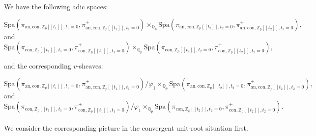 \documentclass[11pt]{book}
\theoremstyle{definition}
\numberwithin{equation}{section}
\begin{document}
\indent We have the following adic spaces:

\begin{displaymath}
\mathrm{Spa}(\pi_{\mathrm{an},\mathrm{con},\mathbb{Z}_p[[t_1]],t_1=0},\pi_{\mathrm{an},\mathrm{con},\mathbb{Z}_p[[t_1]],t_1=0}^+)\times_{\mathbb{Q}_p}\mathrm{Spa}(\pi_{\mathrm{an},\mathrm{con},\mathbb{Z}_p[[t_2]],t_2=0},\pi_{\mathrm{an},\mathrm{con},\mathbb{Z}_p[[t_2]],t_2=0}^+),	
\end{displaymath}
and 
\begin{displaymath}
\mathrm{Spa}(\pi_{\mathrm{con},\mathbb{Z}_p[[t_1]],t_1=0},\pi_{\mathrm{con},\mathbb{Z}_p[[t_1]],t_1=0}^+)\times_{\mathbb{Q}_p}\mathrm{Spa}(\pi_{\mathrm{con},\mathbb{Z}_p[[t_2]],t_2=0},\pi_{\mathrm{con},\mathbb{Z}_p[[t_2]],t_2=0}^+),
\end{displaymath}

and the corresponding $v$-sheaves:

\begin{displaymath}
\mathrm{Spa}(\pi_{\mathrm{an},\mathrm{con},\mathbb{Z}_p[[t_1]],t_1=0},\pi_{\mathrm{an},\mathrm{con},\mathbb{Z}_p[[t_1]],t_1=0}^+)/\varphi_1\times_{\mathbb{Q}_p}\mathrm{Spa}(\pi_{\mathrm{an},\mathrm{con},\mathbb{Z}_p[[t_2]],t_2=0},\pi_{\mathrm{an},\mathrm{con},\mathbb{Z}_p[[t_2]],t_2=0}^+),	
\end{displaymath}
and 
\begin{displaymath}
\mathrm{Spa}(\pi_{\mathrm{con},\mathbb{Z}_p[[t_1]],t_1=0},\pi_{\mathrm{con},\mathbb{Z}_p[[t_1]],t_1=0}^+)/\varphi_1\times_{\mathbb{Q}_p}\mathrm{Spa}(\pi_{\mathrm{con},\mathbb{Z}_p[[t_2]],t_2=0},\pi_{\mathrm{con},\mathbb{Z}_p[[t_2]],t_2=0}^+).
\end{displaymath}\\

\indent We consider the corresponding picture in the convergent unit-root situation first.
\end{document}

